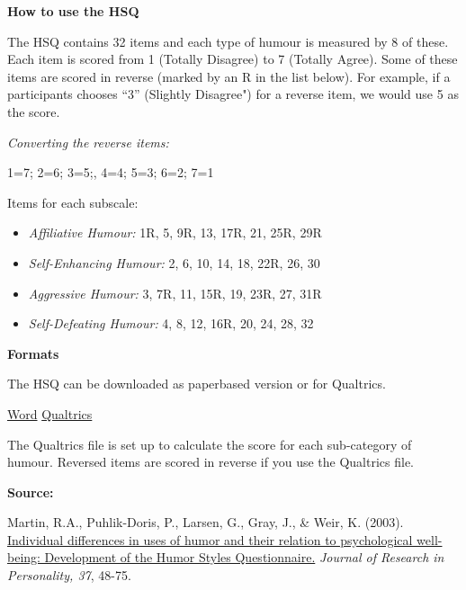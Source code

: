 \documentclass[
]{book}
\providecommand{\tightlist}{%
  \setlength{\itemsep}{0pt}\setlength{\parskip}{0pt}}
\begin{document}
\textbf{How to use the HSQ}

The HSQ contains 32 items and each type of humour is measured by 8 of these. Each item is scored from 1 (Totally Disagree) to 7 (Totally Agree). Some of these items are scored in reverse (marked by an R in the list below). For example, if a participants chooses ``3'' (Slightly Disagree") for a reverse item, we would use 5 as the score.

\emph{Converting the reverse items:}

1=7; 2=6; 3=5;, 4=4; 5=3; 6=2; 7=1

Items for each subscale:

\begin{itemize}
\tightlist
\item
  \emph{Affiliative Humour:} 1R, 5, 9R, 13, 17R, 21, 25R, 29R
\item
  \emph{Self-Enhancing Humour:} 2, 6, 10, 14, 18, 22R, 26, 30
\item
  \emph{Aggressive Humour:} 3, 7R, 11, 15R, 19, 23R, 27, 31R
\item
  \emph{Self-Defeating Humour:} 4, 8, 12, 16R, 20, 24, 28, 32
\end{itemize}

\textbf{Formats}

The HSQ can be downloaded as paperbased version or for Qualtrics.

\href{questionnaires/HumorStylesQuestionnaire.docx}{Word} \textbar{} \href{questionnaires/HumorStylesQuestionnaire.qsf}{Qualtrics}

The Qualtrics file is set up to calculate the score for each sub-category of humour. Reversed items are scored in reverse if you use the Qualtrics file.

\textbf{Source:}

Martin, R.A., Puhlik-Doris, P., Larsen, G., Gray, J., \& Weir, K. (2003). \href{https://d1wqtxts1xzle7.cloudfront.net/56892479/HSQ_article.pdf?1530281324=\&response-content-disposition=inline\%3B+filename\%3DIndividual_differences_in_uses_of_humor.pdf\&Expires=1598969255\&Signature=c2oQ1bWDYeWlwZslWOqrGvNdgjeYek-qW6UbPTZVWozQfdWJ8HAKPZHZRSACz1mNY6TYSVsbQgCYsC~1vG7IWPHEnUyQtT2cWsljBOMDj-m6KECtv9OSsQqBWQqTbOQbaGbyRGaCJbbdYEPr4uNZM8zVWZWB0cQU105xtYzzrqyrEQvnR-8x7Y2-7pCwPBMptT8CLRgiv4~WEz1auOoHClqgZ0pAg6Qe8oTVIYFaX40f0gT2At1JKH-xmb1-IHX7wWz9zux-3WMYZ0~jNi4kruIbEHnSS6HrAmF-sin3lWpItwnvWRJ2XbJEFvaU3HqsWTdmsM2WpnIwBQ8I5mCKpw__\&Key-Pair-Id=APKAJLOHF5GGSLRBV4ZA}{Individual differences in uses of humor and their relation to psychological well-being: Development of the Humor Styles Questionnaire.} \emph{Journal of Research in Personality, 37}, 48-75.
\end{document}
